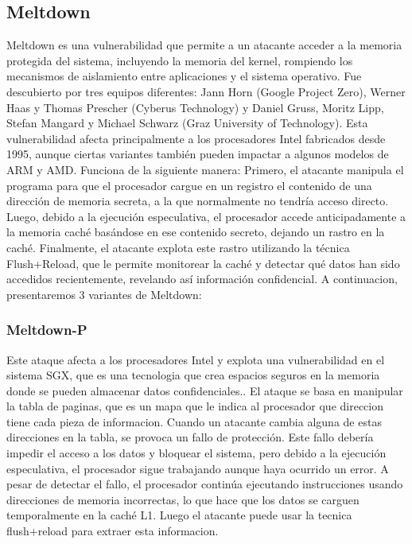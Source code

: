 \documentclass[lettersize,compsoc]{IEEEtran}
\begin{document}
\subsection{Meltdown}
Meltdown es una vulnerabilidad que permite a un atacante acceder a la memoria protegida del sistema, incluyendo la memoria del kernel, rompiendo los mecanismos de aislamiento entre aplicaciones y el sistema operativo.
\newline Fue descubierto por tres equipos diferentes: Jann Horn (Google Project Zero), Werner Haas y Thomas Prescher (Cyberus Technology) y Daniel Gruss, Moritz Lipp, Stefan Mangard y Michael Schwarz (Graz University of Technology).
\newline Esta vulnerabilidad afecta principalmente a los procesadores Intel fabricados desde 1995, aunque ciertas variantes también pueden impactar a algunos modelos de ARM y AMD.
\newline Funciona de la siguiente manera:
\newline Primero, el atacante manipula el programa para que el procesador cargue en un registro el contenido de una dirección de memoria secreta, a la que normalmente no tendría acceso directo.
Luego, debido a la ejecución especulativa, el procesador accede anticipadamente a la memoria caché basándose en ese contenido secreto, dejando un rastro en la caché.
Finalmente, el atacante explota este rastro utilizando la técnica Flush+Reload, que le permite monitorear la caché y detectar qué datos han sido accedidos recientemente, revelando así información confidencial.
\newline A continuacion, presentaremos 3 variantes de Meltdown:
\subsubsection{\textbf{Meltdown-P}}
Este ataque afecta a los procesadores Intel y explota una vulnerabilidad en el sistema SGX, que es una tecnologia que crea espacios seguros en la memoria donde se pueden almacenar datos confidenciales..
\newline El ataque se basa en manipular la tabla de paginas, que es un mapa que le indica al procesador que direccion tiene cada pieza de informacion. Cuando un atacante cambia alguna de estas direcciones en la tabla, se provoca un fallo de protección. Este fallo debería impedir el acceso a los datos y bloquear el sistema, pero debido a la ejecución especulativa, el procesador sigue trabajando aunque haya ocurrido un error. A pesar de detectar el fallo, el procesador continúa ejecutando instrucciones usando direcciones de memoria incorrectas, lo que hace que los datos se carguen temporalmente en la caché L1. Luego el atacante puede usar la tecnica flush+reload para extraer esta informacion.
\end{document}
